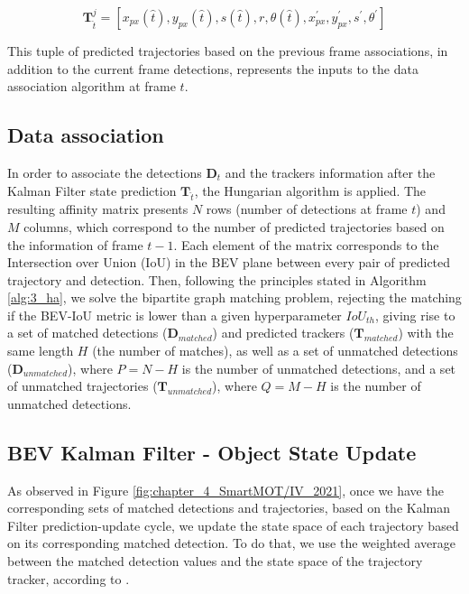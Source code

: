 \begin{equation}
	\label{est}
	\textbf{T}_{\hat{t}}^{j} = [x_{px}(\hat{t}),y_{px}(\hat{t}),s(\hat{t}),r,\theta(\hat{t}),x_{px}^{'},y_{px}^{'},s^{'},\theta^{'}]
\end{equation}

This tuple of predicted trajectories based on the previous frame associations, in addition to the current frame detections, represents the inputs to the data association algorithm at frame $t$.

\subsection{Data association}

In order to associate the detections $\textbf{D}_{t}$ and the trackers information after the Kalman Filter state prediction $\textbf{T}_{\hat{t}}$, the Hungarian algorithm is applied. The resulting affinity matrix presents $N$ rows (number of detections at frame $t$) and $M$ columns, which correspond to the number of predicted trajectories based on the information of frame $t-1$. Each element of the matrix corresponds to the Intersection over Union (IoU) in the \ac{BEV} plane between every pair of predicted trajectory and detection. Then, following the principles stated in Algorithm \ref{alg:3_ha}, we solve the bipartite graph matching problem, rejecting the matching if the BEV-IoU metric is lower than a given hyperparameter $IoU_{th}$, giving rise to a set of matched detections ($\textbf{D}_{matched}$) and predicted trackers ($\textbf{T}_{matched}$) with the same length $H$ (the number of matches), as well as a set of unmatched detections ($\textbf{D}_{unmatched}$), where $P = N - H$ is the number of unmatched detections, and a set of unmatched trajectories ($\textbf{T}_{unmatched}$), where $Q = M - H$ is the number of unmatched detections.

\subsection{BEV Kalman Filter - Object State Update}

As observed in Figure \ref{fig:chapter_4_SmartMOT/IV_2021}, once we have the corresponding sets of matched detections and trajectories, based on the Kalman Filter prediction-update cycle, we update the state space of each trajectory based on its corresponding matched detection. To do that, we use the weighted average between the matched detection values and the state space of the trajectory tracker, according to \cite{kalman1960new}. 


